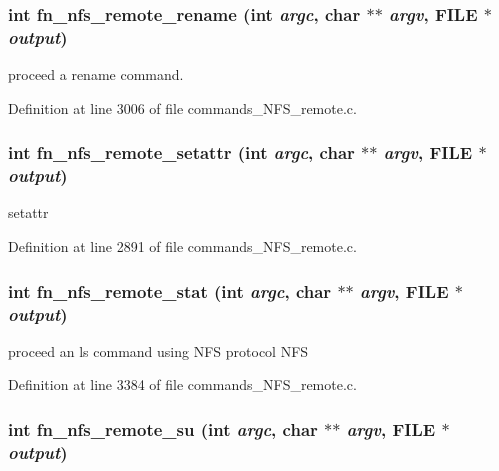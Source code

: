 \subsubsection[{fn\_\-nfs\_\-remote\_\-rename}]{\setlength{\rightskip}{0pt plus 5cm}int fn\_\-nfs\_\-remote\_\-rename (int {\em argc}, \/  char $\ast$$\ast$ {\em argv}, \/  FILE $\ast$ {\em output})}\label{commands__NFS__remote_8c_385e00e4402183dcf9d7bbc6d17de3da}


proceed a rename command. 

Definition at line 3006 of file commands\_\-NFS\_\-remote.c.
\subsubsection[{fn\_\-nfs\_\-remote\_\-setattr}]{\setlength{\rightskip}{0pt plus 5cm}int fn\_\-nfs\_\-remote\_\-setattr (int {\em argc}, \/  char $\ast$$\ast$ {\em argv}, \/  FILE $\ast$ {\em output})}\label{commands__NFS__remote_8c_6cd8456d9ed8ef731cb45ccb4168847a}


setattr 

Definition at line 2891 of file commands\_\-NFS\_\-remote.c.
\subsubsection[{fn\_\-nfs\_\-remote\_\-stat}]{\setlength{\rightskip}{0pt plus 5cm}int fn\_\-nfs\_\-remote\_\-stat (int {\em argc}, \/  char $\ast$$\ast$ {\em argv}, \/  FILE $\ast$ {\em output})}\label{commands__NFS__remote_8c_a1c93ad1ec1bd3c6b83787fbf3983a1f}


proceed an ls command using NFS protocol NFS 

Definition at line 3384 of file commands\_\-NFS\_\-remote.c.
\subsubsection[{fn\_\-nfs\_\-remote\_\-su}]{\setlength{\rightskip}{0pt plus 5cm}int fn\_\-nfs\_\-remote\_\-su (int {\em argc}, \/  char $\ast$$\ast$ {\em argv}, \/  FILE $\ast$ {\em output})}\label{commands__NFS__remote_8c_7e50bf8f40b54033ee4afb6055b2aac2}


